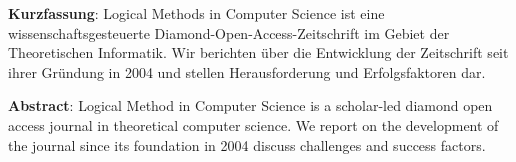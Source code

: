 \textbf{Kurzfassung}: Logical Methods in Computer Science ist eine
wissenschaftsgesteuerte Diamond-Open-Access-Zeitschrift im Gebiet der
Theoretischen Informatik. Wir berichten über die Entwicklung der
Zeitschrift seit ihrer Gründung in 2004 und stellen Herausforderung und
Erfolgsfaktoren dar.

\textbf{Abstract}: Logical Method in Computer Science is a scholar-led
diamond open access journal in theoretical computer science. We report
on the development of the journal since its foundation in 2004 discuss
challenges and success factors.
